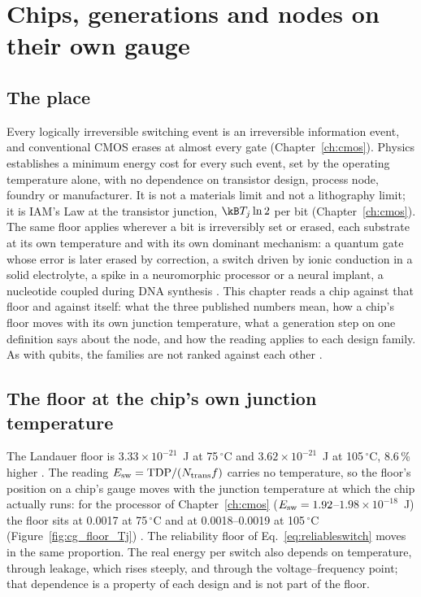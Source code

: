 \chapter{Chips, generations and nodes on their own gauge}\label{ch:chipgen}

\section*{The place}
Every logically irreversible switching event is an irreversible information event, and conventional CMOS erases at almost every gate (Chapter~\ref{ch:cmos}). Physics establishes a minimum energy cost for every such
event, set by the operating temperature alone, with no dependence on transistor design, process node, foundry or manufacturer. It is not a
materials limit and not a lithography limit; it is IAM's Law at the transistor junction, $\kB T_j\ln2$ per bit (Chapter~\ref{ch:cmos}). The same floor applies wherever a bit is irreversibly set or erased, each substrate at its own temperature and with its own dominant
mechanism: a quantum gate whose error is later erased by correction, a switch driven by ionic conduction in a solid electrolyte, a spike in
a neuromorphic processor or a neural implant, a nucleotide coupled during DNA synthesis \interp. This
chapter reads a chip against that floor and against itself: what the three published numbers mean, how a chip's floor moves with its own
junction temperature, what a generation step on one definition says about the node, and how the reading applies to each design family. As
with qubits, the families are not ranked against each other \interp.

\section{The floor at the chip's own junction temperature}\label{sec:cg_floor}
The Landauer floor is $3.33\times10^{-21}$~J at 75\,$^\circ$C and $3.62\times10^{-21}$~J at 105\,$^\circ$C, 8.6\,\% higher \calc. The reading
$E_{\rm sw}=\mathrm{TDP}/(N_{\rm trans}f)$ carries no temperature, so the floor's position on a chip's gauge moves with the junction
temperature at which the chip actually runs: for the processor of Chapter~\ref{ch:cmos} ($E_{\rm sw}=1.92$--$1.98\times10^{-18}$~J) the floor
sits at 0.0017 at 75\,$^\circ$C and at 0.0018--0.0019 at 105\,$^\circ$C (Figure~\ref{fig:cg_floor_Tj}) \calc. The reliability floor of
Eq.~\eqref{eq:reliableswitch} moves in the same proportion. The real energy per switch also depends on temperature, through leakage, which
rises steeply, and through the voltage--frequency point; that dependence is a property of each design and is not part of the floor.

